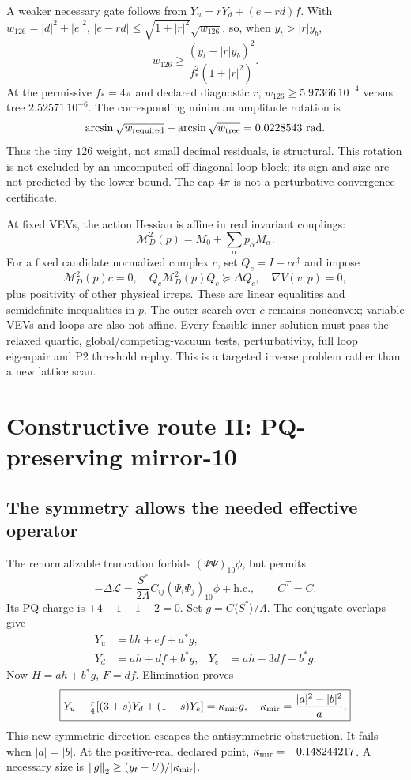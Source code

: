 \documentclass[11pt]{article}
\newcommand{\norm}[1]{\left\lVert#1\right\rVert_2}
\begin{document}
A weaker necessary gate follows from $Y_u=rY_d+(e-rd)f$.
With $w_{126}=|d|^2+|e|^2$,
$|e-rd|\le\sqrt{1+|r|^2}\sqrt{w_{126}}$, so, when $y_t>|r|y_b$,
\begin{equation}
w_{126}\ge
\frac{(y_t-|r|y_b)^2}{f_*^2(1+|r|^2)}.
\end{equation}
At the permissive $f_*=4\pi$ and declared diagnostic $r$,
$w_{126}\ge5.97366\,10^{-4}$ versus tree $2.52571\,10^{-6}$.
The corresponding minimum amplitude rotation is
\[
\arcsin\sqrt{w_{\rm required}}-\arcsin\sqrt{w_{\rm tree}}
=0.0228543\ {\rm rad}.
\]
Thus the tiny $126$ weight, not small decimal residuals, is structural.
This rotation is not excluded by an uncomputed off-diagonal loop block;
its sign and size are not predicted by the lower bound.
The cap $4\pi$ is not a perturbative-convergence certificate.

At fixed VEVs, the action Hessian is affine in real invariant couplings:
\[
\mathcal M_D^2(p)=M_0+\sum_\alpha p_\alpha M_\alpha.
\]
For a fixed candidate normalized complex $c$, set $Q_c=I-cc^\dagger$
and impose
\begin{equation}
\mathcal M_D^2(p)c=0,\quad
Q_c\mathcal M_D^2(p)Q_c\succeq\Delta Q_c,\quad
\nabla V(v;p)=0,
\label{eq:sdp}
\end{equation}
plus positivity of other physical irreps.
These are linear equalities and semidefinite inequalities in $p$.
The outer search over $c$ remains nonconvex; variable VEVs and loops
are also not affine. Every feasible inner solution must pass the
relaxed quartic, global/competing-vacuum tests, perturbativity, full
loop eigenpair and P2 threshold replay. This is a targeted inverse
problem rather than a new lattice scan.

\section{Constructive route II: PQ-preserving mirror-10}
\subsection{The symmetry allows the needed effective operator}
The renormalizable truncation forbids $(\Psi\Psi)_{10}\phi$, but permits
\begin{equation}
-\Delta\mathcal L=
\frac{S^*}{2\Lambda}C_{ij}(\Psi_i\Psi_j)_{10}\phi+\mathrm{h.c.},
\qquad C^T=C.
\end{equation}
Its PQ charge is $+4-1-1-2=0$. Set $g=C\langle S^*\rangle/\Lambda$.
The conjugate overlaps give
\begin{align}
Y_u&=bh+ef+a^*g,\\
Y_d&=ah+df+b^*g,&Y_e&=ah-3df+b^*g .
\end{align}
Now $H=ah+b^*g$, $F=df$. Elimination proves
\begin{equation}
\boxed{
Y_u-\tfrac r4[(3+s)Y_d+(1-s)Y_e]=\kappa_{\rm mir}g,\quad
\kappa_{\rm mir}=\frac{|a|^2-|b|^2}{a}.}
\label{eq:mirror}
\end{equation}
This new symmetric direction escapes the antisymmetric obstruction.
It fails when $|a|=|b|$. At the positive-real declared point,
$\kappa_{\rm mir}=-0.148244217$.
A necessary size is $\norm g\ge(y_t-U)/|\kappa_{\rm mir}|$.
\end{document}
